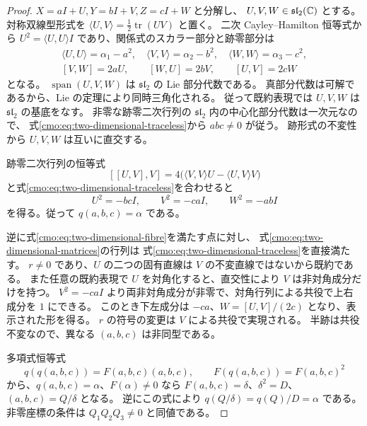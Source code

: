 \begin{proof}
$X=aI+U,Y=bI+V,Z=cI+W$ と分解し、
$U,V,W\in\mathfrak{sl}_2(\mathbb C)$ とする。
対称双線型形式を $\langle U,V\rangle=\frac12\operatorname{tr}(UV)$ と置く。
二次 Cayley--Hamilton 恒等式から
$U^2=\langle U,U\rangle I$ であり、関係式のスカラー部分と跡零部分は
\begin{equation}\label{cmo:eq:two-dimensional-traceless}
 \begin{gathered}
 \langle U,U\rangle=\alpha_1-a^2,\quad
 \langle V,V\rangle=\alpha_2-b^2,\quad
 \langle W,W\rangle=\alpha_3-c^2,\\
 [V,W]=2aU,\qquad [W,U]=2bV,\qquad[U,V]=2cW
 \end{gathered}
\end{equation}
となる。
$\operatorname{span}(U,V,W)$ は $\mathfrak{sl}_2$ の Lie 部分代数である。
真部分代数は可解であるから、Lie の定理により同時三角化される。
従って既約表現では $U,V,W$ は $\mathfrak{sl}_2$ の基底をなす。
非零な跡零二次行列の $\mathfrak{sl}_2$ 内の中心化部分代数は一次元なので、
式\eqref{cmo:eq:two-dimensional-traceless}から $abc\ne0$ が従う。
跡形式の不変性から $U,V,W$ は互いに直交する。

跡零二次行列の恒等式
\[
 [[U,V],V]
 =4\bigl(\langle V,V\rangle U-\langle U,V\rangle V\bigr)
\]
と式\eqref{cmo:eq:two-dimensional-traceless}を合わせると
\[
 U^2=-bcI,\qquad V^2=-caI,\qquad W^2=-abI
\]
を得る。従って $q(a,b,c)=\alpha$ である。

逆に式\eqref{cmo:eq:two-dimensional-fibre}を満たす点に対し、
式\eqref{cmo:eq:two-dimensional-matrices}の行列は
式\eqref{cmo:eq:two-dimensional-traceless}を直接満たす。
$r\ne0$ であり、$U$ の二つの固有直線は $V$ の不変直線ではないから既約である。
また任意の既約表現で $U$ を対角化すると、直交性により $V$ は非対角成分だけを持つ。
$V^2=-caI$ より両非対角成分が非零で、対角行列による共役で上右成分を $1$ にできる。
このとき下左成分は $-ca$、$W=[U,V]/(2c)$ となり、表示された形を得る。
$r$ の符号の変更は $V$ による共役で実現される。
半跡は共役不変なので、異なる $(a,b,c)$ は非同型である。

多項式恒等式
\begin{equation}\label{cmo:eq:quadratic-involution}
 q(q(a,b,c))=F(a,b,c)(a,b,c),\qquad
 F(q(a,b,c))=F(a,b,c)^2
\end{equation}
から、$q(a,b,c)=\alpha$、$F(\alpha)\ne0$ なら
$F(a,b,c)=\delta$、$\delta^2=D$、$(a,b,c)=Q/\delta$ となる。
逆にこの式により $q(Q/\delta)=q(Q)/D=\alpha$ である。
非零座標の条件は $Q_1Q_2Q_3\ne0$ と同値である。
\end{proof}

